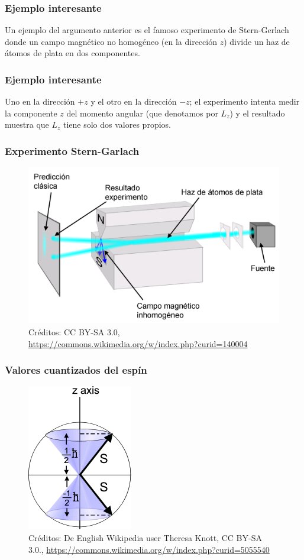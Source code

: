 \documentclass[12pt]{beamer}
\begin{document}
\begin{frame}
\frametitle{Ejemplo interesante}
Un ejemplo del argumento anterior es el famoso experimento de Stern-Gerlach \pause donde un campo magnético no homogéneo (en la dirección $z$) divide un haz de átomos de plata en dos componentes.
\end{frame}
\begin{frame}
\frametitle{Ejemplo interesante}
Uno en la dirección $+z$ y el otro en la dirección $-z$; el experimento intenta medir la componente $z$ del momento angular (que denotamos por $L_{z}$) y el resultado muestra que $L_{z}$ tiene solo dos valores propios.
\end{frame}
\begin{frame}
\frametitle{Experimento Stern-Garlach}
\begin{figure}
    \centering
    \includegraphics[scale=0.6]{Imagenes/Experimento_Stern-Gerlach_01.png}
    \caption{Créditos: CC BY-SA 3.0, \url{https://commons.wikimedia.org/w/index.php?curid=140004}}
\end{figure}
\end{frame}
\begin{frame}
\frametitle{Valores cuantizados del espín}
\begin{figure}
    \centering
    \includegraphics[scale=0.6]{Imagenes/Experimento_Stern-Gerlach_02.png}
    \caption{Créditos: De English Wikipedia user Theresa Knott, CC BY-SA 3.0., \url{https://commons.wikimedia.org/w/index.php?curid=5055540}}
\end{figure}
\end{frame}
\end{document}
